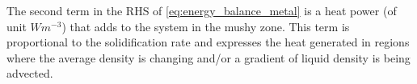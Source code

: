 %
The second term in the RHS of \cref{eq:energy_balance_metal} is a heat power (of unit $Wm^{-3}$) that adds 
to the system in the mushy zone. This term is proportional to the solidification rate and expresses 
the heat generated in regions where the average density is changing and/or a gradient of liquid density is being advected.
